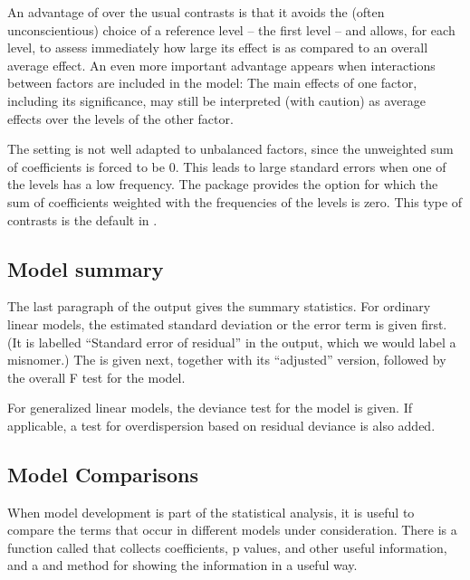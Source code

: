 \documentclass[11pt]{article}\usepackage[]{graphicx}\usepackage[]{color}
\begin{document}
An advantage of  over the usual 
contrasts is that it avoids the (often unconscientious) choice of a
reference level -- the first level -- and allows, for each level, 
to assess immediately how large its effect is as compared to an overall
average effect.
An even more important advantage appears when interactions between factors
are included in the model: 
The main effects of one factor, including its significance, 
may still be interpreted (with caution) as average effects over the
levels of the other factor.

The  setting is not well adapted to unbalanced factors, since
the unweighted sum of coefficients is forced to be 0.
This leads to large standard errors when one of the levels has a low 
frequency. 
The  package provides the option  for which the
sum of coefficients weighted with the frequencies of the levels is zero.
This type of contrasts is the default in .

\subsection{Model summary}
The last paragraph of the output gives the summary statistics.
For ordinary linear models, the estimated standard deviation or the error
term is given first. (It is labelled ``Standard error of residual'' in the 
 output, which we would label a misnomer.)
The  is given next, together with its ``adjusted''
version, followed by the overall F test for the model.

For generalized linear models, the deviance test for the model is given.
If applicable, a test for overdispersion based on residual deviance is also
added. 

\subsection{Model Comparisons}
When model development is part of the statistical analysis, it is useful to
compare the terms that occur in different models under consideration.
There is a function called  that collects coefficients, 
p values, and other useful information, and a  and  
method for showing the information in a useful way.
\end{document}
